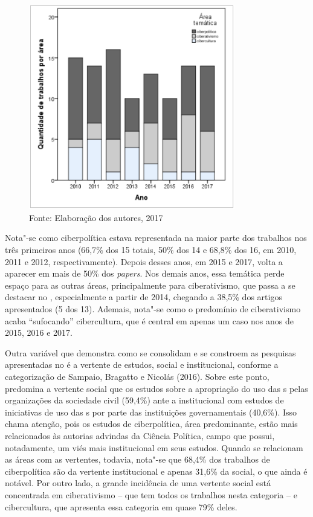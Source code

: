 \begin{figure}[!ht]
\centering
 \includegraphics[width=90mm]{./imgs/graf3_5.png}
\caption{Fonte: Elaboração dos autores, 2017}
\end{figure}

Nota"-se como ciberpolítica estava representada na maior parte dos
trabalhos nos três primeiros anos (66,7\% dos 15 totais, 50\% dos 14 e
68,8\% dos 16, em 2010, 2011 e 2012, respectivamente). Depois desses
anos, em 2015 e 2017, volta a aparecer em mais de 50\% dos
\emph{papers}. Nos demais anos, essa temática perde espaço para as
outras áreas, principalmente para ciberativismo, que passa a se destacar
no , especialmente a partir de 2014, chegando a 38,5\% dos artigos
apresentados (5 dos 13). Ademais, nota"-se como o predomínio de
ciberativismo acaba ``sufocando'' cibercultura, que é central em apenas
um caso nos anos de 2015, 2016 e 2017.

Outra variável que demonstra como se consolidam e se constroem as
pesquisas apresentadas no  é a vertente de estudos, social e
institucional, conforme a categorização de Sampaio, Bragatto e Nicolás
(2016). Sobre este ponto, predomina a vertente social que os estudos
sobre a apropriação do uso das s pelas organizações da sociedade
civil (59,4\%) ante a institucional com estudos de iniciativas de uso
das s por parte das instituições governamentais (40,6\%). Isso chama
atenção, pois os estudos de ciberpolítica, área predominante, estão mais
relacionados às autorias advindas da Ciência Política, campo que possui,
notadamente, um viés mais institucional em seus estudos. Quando se
relacionam as áreas com as vertentes, todavia, nota"-se que 68,4\% dos
trabalhos de ciberpolítica são da vertente institucional e apenas 31,6\%
da social, o que ainda é notável. Por outro lado, a grande incidência de
uma vertente social está concentrada em ciberativismo -- que tem todos
os trabalhos nesta categoria -- e cibercultura, que apresenta essa
categoria em quase 79\% deles.


